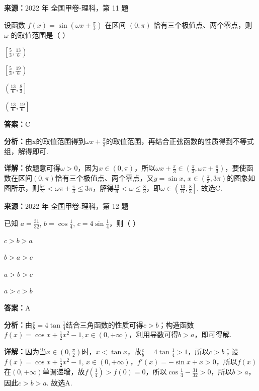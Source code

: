 \begin{question}[points=5]
\textbf{来源：}2022 年 全国甲卷-理科，第 11 题\par
设函数 $f(x)=\sin\left(\omega x+\frac{\pi}{3}\right)$ 在区间 $(0,\pi)$ 恰有三个极值点、两个零点，则 $\omega$ 的取值范围是（ ）
\begin{choices}
  \item $\left[\frac{5}{3},\frac{13}{6}\right)$
  \item $\left[\frac{5}{3},\frac{19}{6}\right)$
  \item $\left(\frac{13}{6},\frac{8}{3}\right]$
  \item $\left(\frac{13}{6},\frac{19}{6}\right]$
\end{choices}
\begin{solution}
\textbf{答案：}C

\textbf{分析：}由x的取值范围得到$\omega x+\frac{\pi}{3}$的取值范围，再结合正弦函数的性质得到不等式组，解得即可.

\textbf{详解：}依题意可得$\omega>0$，因为$x\in(0,\pi)$，所以$\omega x+\frac{\pi}{3}\in\left(\frac{\pi}{3},\omega\pi+\frac{\pi}{3}\right)$，要使函数在区间$(0,\pi)$恰有三个极值点、两个零点，又$y=\sin x$, $x\in\left(\frac{\pi}{3},3\pi\right)$的图象如图所示，则$\frac{5\pi}{2}<\omega\pi+\frac{\pi}{3}\leq 3\pi$，解得$\frac{13}{6}<\omega\leq\frac{8}{3}$，即$\omega\in\left(\frac{13}{6},\frac{8}{3}\right]$. 故选C.
\end{solution}
\end{question}

\begin{question}[points=5]
\textbf{来源：}2022 年 全国甲卷-理科，第 12 题\par
已知 $a=\frac{31}{32}$, $b=\cos\frac{1}{4}$, $c=4\sin\frac{1}{4}$，则（ ）
\begin{choices}
  \item $c>b>a$
  \item $b>a>c$
  \item $a>b>c$
  \item $a>c>b$
\end{choices}
\begin{solution}
\textbf{答案：}A

\textbf{分析：}由$\frac{c}{b}=4\tan\frac{1}{4}$结合三角函数的性质可得$c>b$；构造函数$f(x)=\cos x+\frac{1}{2}x^2-1, x\in(0,+\infty)$，利用导数可得$b>a$，即可得解.

\textbf{详解：}因为当$x\in(0,\frac{\pi}{2})$时，$x<\tan x$，故$\frac{c}{b}=4\tan\frac{1}{4}>1$，所以$c>b$；设$f(x)=\cos x+\frac{1}{2}x^2-1$, $x\in(0,+\infty)$，$f'(x)=-\sin x+x>0$，所以$f(x)$在$(0,+\infty)$单调递增，故$f(\frac{1}{4})>f(0)=0$，所以$\cos\frac{1}{4}-\frac{31}{32}>0$，所以$b>a$，因此$c>b>a$. 故选A.
\end{solution}
\end{question}

